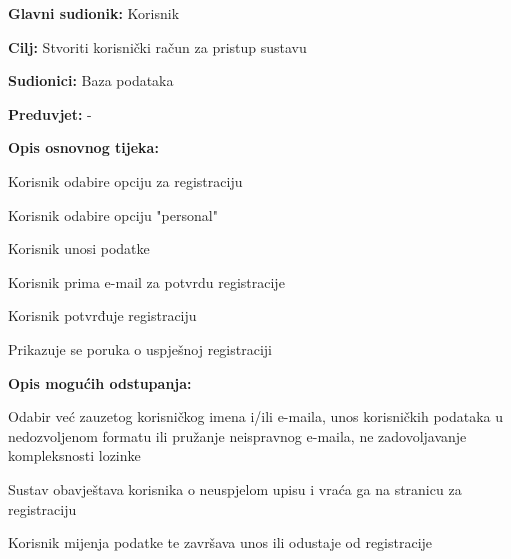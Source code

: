					\noindent {}
					\begin{packed_item}
	
						\item \textbf{Glavni sudionik: }Korisnik
						\item  \textbf{Cilj:} Stvoriti korisnički račun za pristup sustavu
						\item  \textbf{Sudionici:} Baza podataka
						\item  \textbf{Preduvjet:} -
						\item  \textbf{Opis osnovnog tijeka:}
						
						\item[] \begin{packed_enum}
	
							\item Korisnik odabire opciju za registraciju
							\item Korisnik odabire opciju "personal"
							\item Korisnik unosi podatke
							\item Korisnik prima e-mail za potvrdu registracije
							\item Korisnik potvrđuje registraciju
							\item Prikazuje se poruka o uspješnoj registraciji

						\end{packed_enum}
						
						\item  \textbf{Opis mogućih odstupanja:}
						
						\item[] \begin{packed_item}
	
							\item[2.a] Odabir već zauzetog korisničkog imena i/ili e-maila, unos korisničkih podataka u nedozvoljenom formatu ili pružanje neispravnog e-maila, ne zadovoljavanje kompleksnosti lozinke
							\item[] \begin{packed_enum}
								
								\item Sustav obavještava korisnika o neuspjelom upisu i vraća ga na stranicu za registraciju
								\item Korisnik mijenja podatke te završava unos ili odustaje od registracije
								
							\end{packed_enum}
							
						\end{packed_item}
					\end{packed_item}
					
